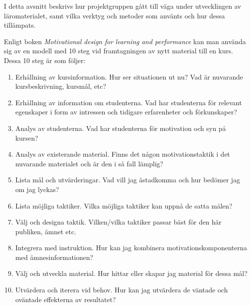 \documentclass[]{article}
\begin{document}


I detta avsnitt beskrivs hur projektgruppen gått till väga under utvecklingen av läromaterialet, samt vilka verktyg och
metoder som använts och hur dessa tillämpats.

Enligt boken \textit{Motivational design for learning and performance} kan man använda sig av en modell med 10 steg vid
framtagningen av nytt material till en kurs. Dessa 10 steg är som följer:

\begin{enumerate}
  \item Erhållning av kursinformation. Hur ser situationen ut nu? Vad är nuvarande kursbeskrivning, kursmål, etc?
  \item Erhållning av information om studenterna. Vad har studenterna för relevant egenskaper i form av intressen och
  tidigare erfarenheter och förkunskaper?
  \item Analys av studenterna. Vad har studenterna för motivation och syn på kursen?
  \item Analys av existerande material. Finns det någon motivationstaktik i det nuvarande materialet och är den i så
  fall lämplig?
  \item Lista mål och utvärderingar. Vad vill jag åstadkomma och hur bedömer jag om jag lyckas?
  \item Lista möjliga taktiker. Vilka möjliga taktiker kan uppnå de satta målen?
  \item Välj och designa taktik. Vilken/vilka taktiker passar bäst för den här publiken, ämnet etc.
  \item Integrera med instruktion. Hur kan jag kombinera motivationskomponenterna med ämnesinformationen?
  \item Välj och utveckla material. Hur hittar eller skapar jag material för dessa mål?
  \item Utvärdera och iterera vid behov. Hur kan jag utvärdera de väntade och oväntade effekterna av resultatet?
\end{enumerate}
\end{document}
